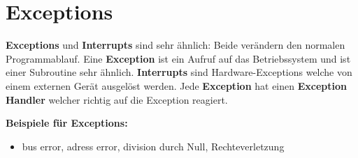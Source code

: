 \section{Exceptions}
\textbf{Exceptions} und \textbf{Interrupts} sind sehr ähnlich: Beide verändern den normalen Programmablauf.
Eine \textbf{Exception} ist ein Aufruf auf das Betriebssystem und ist einer Subroutine sehr ähnlich. 
\textbf{Interrupts} sind Hardware-Exceptions welche von einem externen Gerät ausgelöst werden.
Jede \textbf{Exception} hat einen \textbf{Exception Handler} welcher richtig auf die Exception reagiert.

\textbf{Beispiele für Exceptions:} 
\begin{itemize}
  \item bus error, adress error, division durch Null, Rechteverletzung
\end{itemize}
